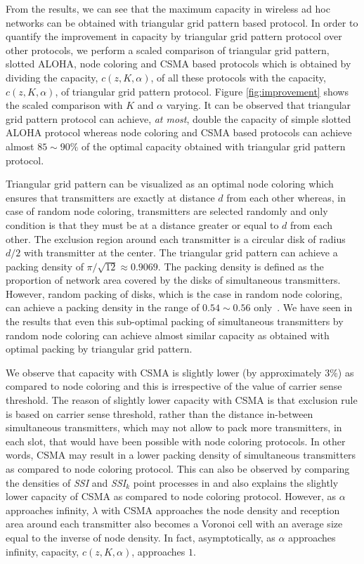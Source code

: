 \documentclass[12pt,english]{article}
\begin{document}
From the results, we can see that the maximum capacity in wireless ad hoc networks can be obtained with triangular grid pattern based protocol. In order to quantify the improvement in capacity by triangular grid pattern protocol over other protocols, we perform a scaled comparison of triangular grid pattern, slotted ALOHA, node coloring and CSMA based protocols which is obtained by dividing the capacity, $c(z,K,\alpha)$, of all these protocols with the capacity, $c(z,K,\alpha)$, of triangular grid pattern protocol. Figure \ref{fig:improvement} shows the scaled comparison with $K$ and $\alpha$ varying. It can be observed that triangular grid pattern protocol can achieve, {\it at most}, double the capacity of simple slotted ALOHA protocol whereas node coloring and CSMA based protocols can achieve almost \mbox{$85\sim90\%$} of the optimal capacity obtained with triangular grid pattern protocol. 

Triangular grid pattern can be visualized as an optimal node coloring which ensures that transmitters are exactly at distance $d$ from each other whereas, in case of random node coloring, transmitters are selected randomly and only condition is that they must be at a distance greater or equal to $d$ from each other. The exclusion region around each transmitter is a circular disk of radius $d/2$ with transmitter at the center. The triangular grid pattern can achieve a packing density of \mbox{$\pi/\sqrt{12}\approx0.9069$}. The packing density is defined as the proportion of network area covered by the disks of simultaneous transmitters. However, random packing of disks, which is the case in random node coloring, can achieve a packing density in the range of \mbox{$0.54\sim0.56$} only~\cite{disk,Busson}. We have seen in the results that even this sub-optimal packing of simultaneous transmitters by random node coloring can achieve almost similar capacity as obtained with optimal packing by triangular grid pattern. 

We observe that capacity with CSMA is slightly lower (by approximately $3\%$) as compared to node coloring and this is irrespective of the value of carrier sense threshold. The reason of slightly lower capacity with CSMA is that exclusion rule is based on carrier sense threshold, rather than the distance in-between simultaneous transmitters, which may not allow to pack more transmitters, in each slot, that would have been possible with node coloring protocols. In other words, CSMA may result in a lower packing density of simultaneous transmitters as compared to node coloring protocol. This can also be observed by comparing the densities of {\em SSI} and {\em SSI$_k$} point processes in \cite{Busson} and also explains the slightly lower capacity of CSMA as compared to node coloring protocol. However, as $\alpha$ approaches infinity, $\lambda$ with CSMA approaches the node density and reception area around each transmitter also becomes a Voronoi cell with an average size equal to the inverse of node density. In fact, asymptotically, as $\alpha$ approaches infinity, capacity, $c(z,K,\alpha)$, approaches $1$.
\end{document}
